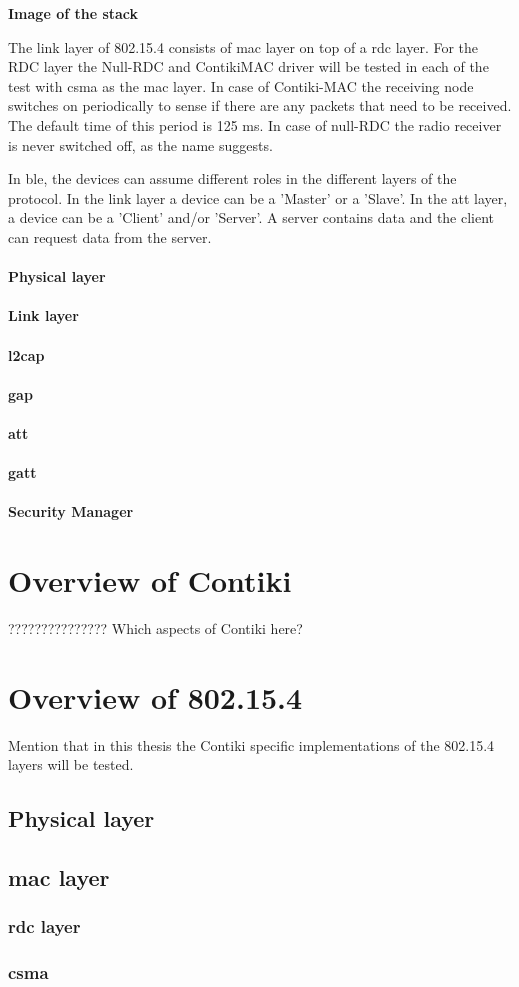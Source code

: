 \textbf{Image of the stack}

The link layer of 802.15.4 consists of \gls{mac} layer on top of a \gls{rdc} layer. For the RDC layer the Null-RDC and ContikiMAC driver will be tested in each of the test with \gls{csma} as the \gls{mac} layer. In case of Contiki-MAC the receiving node switches on periodically to sense if there are any packets that need to be received. The default time of this period is 125 ms. In case of null-RDC the radio receiver is never switched off, as the name suggests.

In \gls{ble}, the devices can assume different roles in the different layers of the protocol. In the link layer a device can be a 'Master' or a 'Slave'. In the \gls{att} layer, a device can be a 'Client' and/or 'Server'. A server contains data and the client can request data from the server.

\paragraph{Physical layer}
\paragraph{Link layer}
\paragraph{\gls{l2cap}}
\paragraph{\gls{gap}}
\paragraph{\gls{att}}
\paragraph{\gls{gatt}}
\paragraph{Security Manager}

\section{Overview of Contiki}
??????????????? Which aspects of Contiki here?

\section{Overview of 802.15.4}
Mention that in this thesis the Contiki specific implementations of the 802.15.4 layers will be tested.

\subsection{Physical layer}

\subsection{\gls{mac} layer}
\subsubsection{\gls{rdc} layer}
\subsubsection{\gls{csma}}


